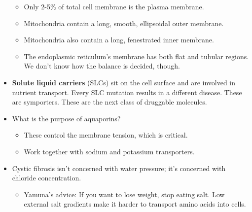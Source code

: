 \documentclass[../notes.tex]{subfiles}
\begin{document}
\begin{itemize}
    \begin{itemize}
        \item Only 2-5\% of total cell membrane is the plasma membrane.
        \item Mitochondria contain a long, smooth, ellipsoidal outer membrane.
        \item Mitochondria also contain a long, fenestrated inner membrane.
        \item The endoplasmic reticulum's membrane has both flat and tubular regions. We don't know how the balance is decided, though.
    \end{itemize}
    \item \textbf{Solute liquid carriers} (SLCs) sit on the cell surface and are involved in nutrient transport. Every SLC mutation results in a different disease. These are symporters. These are the next class of druggable molecules.
    \item What is the purpose of aquaporins?
    \begin{itemize}
        \item These control the membrane tension, which is critical.
        \item Work together with sodium and potassium transporters.
    \end{itemize}
    \item Cystic fibrosis isn't concerned with water pressure; it's concerned with chloride concentration.
    \begin{itemize}
        \item Yamuna's advice: If you want to lose weight, stop eating salt. Low external salt gradients make it harder to transport amino acids into cells.
    \end{itemize}
\end{itemize}
\end{document}
